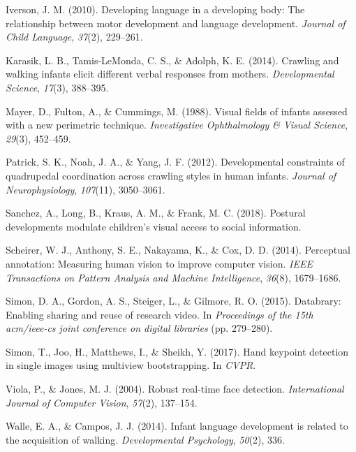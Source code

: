 \documentclass[english,man]{apa6}
\begin{document}
\hypertarget{ref-iverson2010}{}
Iverson, J. M. (2010). Developing language in a developing body: The
relationship between motor development and language development.
\emph{Journal of Child Language}, \emph{37}(2), 229--261.

\hypertarget{ref-karasik2014}{}
Karasik, L. B., Tamis-LeMonda, C. S., \& Adolph, K. E. (2014). Crawling
and walking infants elicit different verbal responses from mothers.
\emph{Developmental Science}, \emph{17}(3), 388--395.

\hypertarget{ref-mayer1988}{}
Mayer, D., Fulton, A., \& Cummings, M. (1988). Visual fields of infants
assessed with a new perimetric technique. \emph{Investigative
Ophthalmology \& Visual Science}, \emph{29}(3), 452--459.

\hypertarget{ref-patrick2012developmental}{}
Patrick, S. K., Noah, J. A., \& Yang, J. F. (2012). Developmental
constraints of quadrupedal coordination across crawling styles in human
infants. \emph{Journal of Neurophysiology}, \emph{107}(11), 3050--3061.

\hypertarget{ref-sanchez2018postural}{}
Sanchez, A., Long, B., Kraus, A. M., \& Frank, M. C. (2018). Postural
developments modulate children's visual access to social information.

\hypertarget{ref-scheirer2014perceptual}{}
Scheirer, W. J., Anthony, S. E., Nakayama, K., \& Cox, D. D. (2014).
Perceptual annotation: Measuring human vision to improve computer
vision. \emph{IEEE Transactions on Pattern Analysis and Machine
Intelligence}, \emph{36}(8), 1679--1686.

\hypertarget{ref-simon2015databrary}{}
Simon, D. A., Gordon, A. S., Steiger, L., \& Gilmore, R. O. (2015).
Databrary: Enabling sharing and reuse of research video. In
\emph{Proceedings of the 15th acm/ieee-cs joint conference on digital
libraries} (pp. 279--280).

\hypertarget{ref-simon2017hand}{}
Simon, T., Joo, H., Matthews, I., \& Sheikh, Y. (2017). Hand keypoint
detection in single images using multiview bootstrapping. In
\emph{CVPR}.

\hypertarget{ref-viola2004robust}{}
Viola, P., \& Jones, M. J. (2004). Robust real-time face detection.
\emph{International Journal of Computer Vision}, \emph{57}(2), 137--154.

\hypertarget{ref-walle2014}{}
Walle, E. A., \& Campos, J. J. (2014). Infant language development is
related to the acquisition of walking. \emph{Developmental Psychology},
\emph{50}(2), 336.
\end{document}

